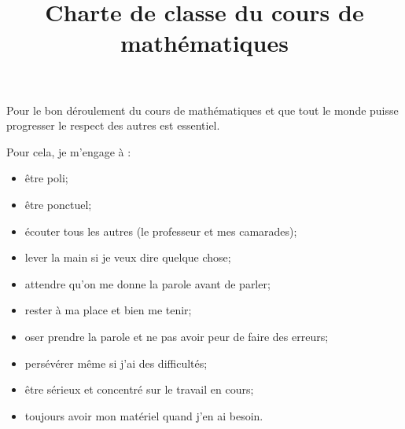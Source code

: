 \documentclass[a4paper, 14pt]{extarticle}
\author{}
\title{Charte de classe du cours de mathématiques}
\date{}
\begin{document}
\maketitle	
\thispagestyle{empty}

\vspace*{-1cm}
	

Pour le bon déroulement du cours de mathématiques et que tout le monde puisse progresser le respect des autres est essentiel.

\vspace*{1cm}

Pour cela, je m'engage à :

\begin{itemize}
	\item être poli;
	\item être ponctuel;
	\item écouter tous les autres (le professeur et mes camarades);
	\item lever la main si je veux dire quelque chose;
	\item attendre qu'on me donne la parole avant de parler;
	\item rester à ma place et bien me tenir;
	\item oser prendre la parole et ne pas avoir peur de faire des erreurs;
	\item persévérer même si j'ai des difficultés; 
	\item être sérieux et concentré sur le travail en cours;
	\item toujours avoir mon matériel quand j'en ai besoin.
	
\end{itemize}
%
%	
%			
\end{document}
